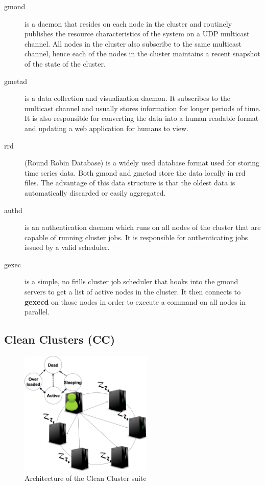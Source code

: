 \begin{description}
    \item[gmond] is a daemon that resides on each node in the cluster and routinely publishes the resource characteristics of the system on a UDP multicast channel. All nodes in the cluster also subscribe to the same multicast channel, hence each of the nodes in the cluster maintains a recent snapshot of the state of the cluster.
    \item[gmetad] is a data collection and visualization daemon. It subscribes to the multicast channel and usually stores information for longer periods of time. It is also responsible for converting the data into a human readable format and updating a web application for humans to view.
    \item[rrd] (Round Robin Database) is a widely used database format used for storing time series data. Both gmond and gmetad store the data locally in rrd files. The advantage of this data structure is that the oldest data is automatically discarded or easily aggregated.
    \item[authd] is an authentication daemon which runs on all nodes of the cluster that are capable of running cluster jobs. It is responsible for authenticating jobs issued by a valid scheduler.
    \item[gexec] is a simple, no frills cluster job scheduler that hooks into the gmond servers to get a list of active nodes in the cluster. It then connects to {\bf gexecd} on those nodes in order to execute a command on all nodes in parallel.
\end{description}


\subsection{Clean Clusters (CC)} %
\label{sub:cleanclusters_cc_}
\begin{figure}[ht]
\centering
\begin{center}
\includegraphics[width=2.5in]{graphs/CCd-arch.pdf}
\vspace{-0.1in}
\caption{{\normalsize Architecture of the Clean Cluster suite}\label{fig:cc-arch}}
\vspace{-0.1in}
\end{center}
\end{figure}

